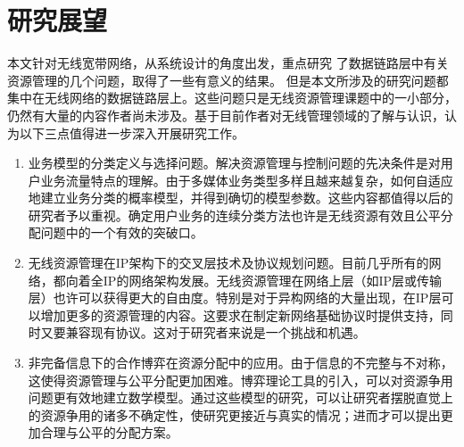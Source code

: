 \section{研究展望}
本文针对无线宽带网络，从系统设计的角度出发，重点研究
了数据链路层中有关资源管理的几个问题，取得了一些有意义的结果。
但是本文所涉及的研究问题都集中在无线网络的数据链路层上。这些问题只是无线资源管理课题中的一小部分，仍然有大量的内容作者尚未涉及。基于目前作者对无线管理领域的了解与认识，认为以下三点值得进一步深入开展研究工作。
\begin{enumerate}[(1)]
\item 业务模型的分类定义与选择问题。解决资源管理与控制问题的先决条件是对用户业务流量特点的理解。由于多媒体业务类型多样且越来越复杂，如何自适应地建立业务分类的概率模型，并得到确切的模型参数。这些内容都值得以后的研究者予以重视。确定用户业务的连续分类方法也许是无线资源有效且公平分配问题中的一个有效的突破口。
\item 无线资源管理在IP架构下的交叉层技术及协议规划问题。目前几乎所有的网络，都向着全IP的网络架构发展。无线资源管理在网络上层（如IP层或传输层）也许可以获得更大的自由度。特别是对于异构网络的大量出现，在IP层可以增加更多的资源管理的内容。这要求在制定新网络基础协议时提供支持，同时又要兼容现有协议。这对于研究者来说是一个挑战和机遇。
\item 非完备信息下的合作博弈在资源分配中的应用。由于信息的不完整与不对称，这使得资源管理与公平分配更加困难。博弈理论工具的引入，可以对资源争用问题更有效地建立数学模型。通过这些模型的研究，可以让研究者摆脱直觉上的资源争用的诸多不确定性，使研究更接近与真实的情况；进而才可以提出更加合理与公平的分配方案。
\end{enumerate}

